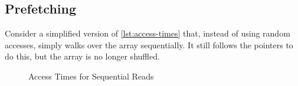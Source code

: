 \subsection{Prefetching}
\label{sec:prefetch}

Consider
a simplified version of \cref{lst:access-times} that, instead of using random accesses,
simply walks over the array sequentially.  It still follows the pointers to do this, but
the array is no longer shuffled.


\begin{figure}
   \centering
   \caption{Access Times for Sequential Reads}
   \label{fig:seq-access-times}
\end{figure}


